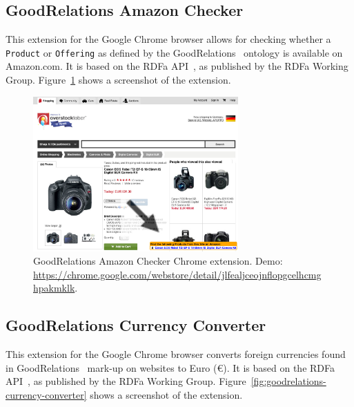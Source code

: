 \documentclass[12pt]{article}
\begin{document}
\subsection{GoodRelations Amazon Checker}
This extension for the Google Chrome browser allows for checking whether a \texttt{Product} or \texttt{Offering} as defined by the GoodRelations~\cite{Hepp:GoodRelations} ontology is available on Amazon.com. It is based on the RDFa API~\cite{rdfa:api}, as published by the RDFa Working Group. Figure~\ref{fig:goodrelations-amazon-checker} shows a screenshot of the extension.

\begin{figure}[htbp!]
\begin{center}
    \includegraphics[width=0.7\textwidth]{./resources/goodrelations-amazon-checker.png}
    \caption[GoodRelations Amazon Checker Chrome extension.]{GoodRelations Amazon Checker Chrome extension. Demo: \url{https://chrome.google.com/webstore/detail/jlfealjceojnflopgcelhcmghpakmklk}.}   
  \label{fig:goodrelations-amazon-checker}
  \end{center}  
\end{figure}

\subsection{GoodRelations Currency Converter}
This extension for the Google Chrome browser converts foreign currencies found in GoodRelations~\cite{Hepp:GoodRelations} mark-up on websites to Euro (\euro). It is based on the RDFa API~\cite{rdfa:api}, as published by the RDFa Working Group. Figure~\ref{fig:goodrelations-currency-converter} shows a screenshot of the extension.
\end{document}
